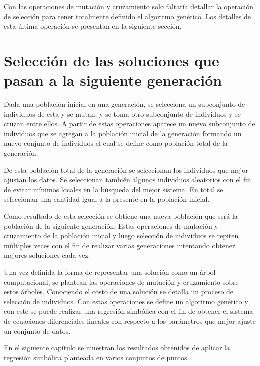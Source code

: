 \begin{center}
\begin{adjustbox}{width=0.5\textwidth, keepaspectratio}
    \end{adjustbox}
\end{center}

Con las operaciones de mutación y cruzamiento solo faltaría detallar la operación de selección para tener totalmente definido el algoritmo genético. Los detalles de esta última operación se presentan en la siguiente sección.

\section{Selección de las soluciones que pasan a la siguiente generación}\label{section:selection}

Dada una población inicial en una generación, se selecciona un subconjunto de individuos de esta y se mutan, y se toma otro subconjunto de individuos y se cruzan entre ellos. A partir de estas operaciones aparece un nuevo subconjunto de individuos que se agregan a la población inicial de la generación formando un nuevo conjunto de individuos el cual se define como población total de la generación.

De esta población total de la generación se seleccionan los individuos que mejor ajustan los datos. Se seleccionan también algunos individuos aleatorios con el fin de evitar mínimos locales en la búsqueda del mejor sistema. En total se seleccionan una cantidad igual a la presente en la población inicial.

Como resultado de esta selección se obtiene una nueva población que será la población de la siguiente generación. Estas operaciones de mutación y cruzamiento de la población inicial y luego selección de individuos se repiten múltiples veces con el fin de realizar varias generaciones intentando obtener mejores soluciones cada vez.

Una vez definida la forma de representar una solución como un árbol computacional, se plantean las operaciones de mutación y cruzamiento sobre estos árboles. Conociendo el costo de una solución se detalla un proceso de selección de individuos. Con estas operaciones se define un algoritmo genético y con este se puede realizar una regresión simbólica con el fin de obtener el sistema de ecuaciones diferenciales lineales con respecto a los parámetros que mejor ajuste un conjunto de datos.

En el siguiente capítulo se muestran los resultados obtenidos de aplicar la regresión simbólica planteada en varios conjuntos de puntos.